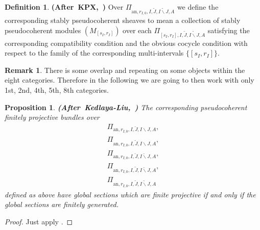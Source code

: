 \documentclass[12pt]{amsart}
\newtheorem{proposition}[theorem]{Proposition}
\theoremstyle{definition}
\newtheorem{definition}[theorem]{Definition}
\newtheorem{remark}[theorem]{Remark}
\numberwithin{equation}{section}
\begin{document}
\begin{definition} \mbox{\bf{(After KPX, \cite[Definition 2.1.3]{KPX})}}
Over $\Pi_{\mathrm{an},r_{I,0},I,\widetilde{J},\widetilde{I\backslash J},A}$ we define the corresponding stably pseudocoherent sheaves to mean a collection of stably pseudocoherent modules $(M_{[s_I,r_I]})$ over each $\Pi_{[s_I,r_I],I,\widetilde{J},\widetilde{I\backslash J},A}$ satisfying the corresponding compatibility condition and the obvious cocycle condition with respect to the family of the corresponding multi-intervals $\{[s_I,r_I]\}$.
\end{definition}


\begin{remark}
There is some overlap and repeating on some objects within the eight categories. Therefore in the following we are going to then work with only 1st, 2nd, 4th, 5th, 8th categories. 	
\end{remark}
	





\begin{proposition} \mbox{\bf{(After Kedlaya-Liu, \cite[Corollary 2.6.8]{KL2})}}
The corresponding pseudocoherent finitely projective bundles over
\begin{align}
\Pi_{\mathrm{an},r_{I,0},I,\breve{J},I\backslash J,A},\\
\Pi_{\mathrm{an},r_{I,0},I,\widetilde{J},I\backslash J,A},\\
\Pi_{\mathrm{an},r_{I,0},I,\breve{J},\breve{I\backslash J},A},\\
\Pi_{\mathrm{an},r_{I,0},I,\widetilde{J},\breve{I\backslash J},A},\\
\Pi_{\mathrm{an},r_{I,0},I,\widetilde{J},\widetilde{I\backslash J},A}
\end{align}
defined as above have global sections which are finite projective if and only if the global sections are finitely generated. 	
\end{proposition}

\begin{proof}
Just apply \cite[Corollary 2.6.8]{KL2}.	
\end{proof}
\end{document}
